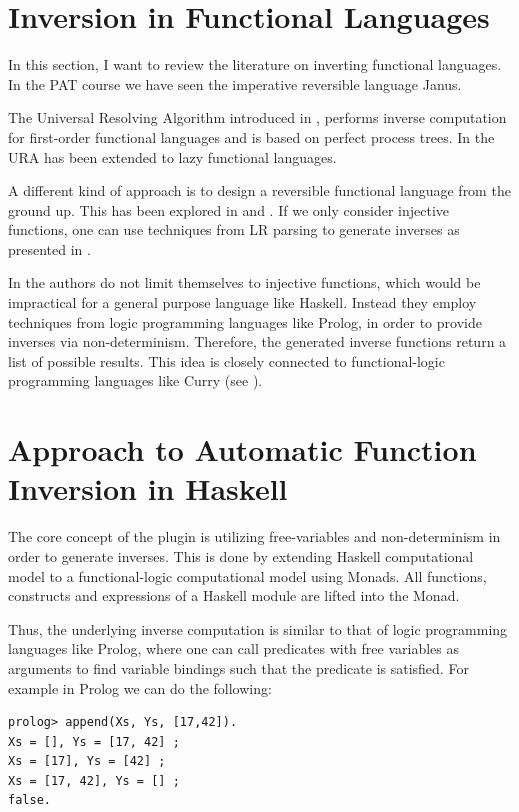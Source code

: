 \documentclass[12pt,a4paper, dvipsnames,usenames]{article}
\begin{document}
\section{Inversion in Functional Languages}

In this section, I want to review the literature on inverting functional languages.
In the PAT course we have seen the imperative reversible language
Janus.

The Universal Resolving Algorithm introduced in \cite{abramov2000universal},
performs inverse computation for first-order functional
languages and is based on perfect process trees.
In \cite{abramov2007universal} the URA has
been extended to lazy functional languages.

A different kind of approach is to design a reversible functional language
from the ground up. This has been
explored in \cite{yokoyama2012towards} and \cite{mu2004}.
If we only consider injective functions, one
can use techniques from LR parsing to generate
inverses as presented in \cite{gluck2004LR}.

In \cite{teegen2021haskell} the authors do not limit themselves to
injective functions, which would be impractical for  a general purpose
language like Haskell. Instead they employ
techniques from logic programming languages like Prolog, in order to provide
inverses via non-determinism. Therefore, the generated inverse
functions return a list of possible results.
This idea is closely connected to functional-logic programming languages like
Curry (see \cite{Hanus2013Curry}).


\section{Approach to Automatic Function Inversion in Haskell}

The core concept of the plugin is utilizing free-variables and non-determinism
in order to generate inverses. This is done by extending Haskell computational
model to a functional-logic computational model using Monads.
All functions, constructs and expressions of a Haskell module
are lifted into the Monad.

Thus, the underlying inverse computation is similar to that of
logic programming languages like Prolog, where one can call predicates
with free variables as arguments to find
variable bindings such that the predicate is satisfied.
For example in Prolog we can do the following:

\begin{verbatim}
prolog> append(Xs, Ys, [17,42]).
Xs = [], Ys = [17, 42] ;
Xs = [17], Ys = [42] ;
Xs = [17, 42], Ys = [] ;
false.
\end{verbatim}
\end{document}
